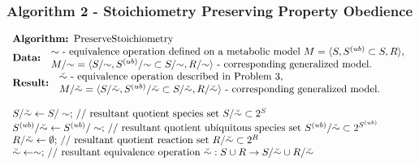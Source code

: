 \documentclass[9pt]{article}
\newcounter{def}
\begin{document}
\subsubsection*{Algorithm 2 - Stoichiometry Preserving Property Obedience}
\[ \begin{array}{l}
\mbox{\textbf{Algorithm: }PreserveStoichiometry}\\
\mbox{\textbf{Data: }} \begin{array}{l} \mbox{${\sim}$ - equivalence operation defined on a metabolic model $M=\langle S, S^{(ub)}\subset{S}, R \rangle$,}\\ \mbox{$M/{\sim} = \langle S/{\sim}, S^{(ub)}/{\sim} \subset S/{\sim}, R/{\sim} \rangle$ - corresponding generalized model.} 
\end{array}\\
\mbox{\textbf{Result: }} \begin{array}{l} \mbox{$\breve{\sim}$ - equivalence operation described in Problem~3,}\\  \mbox{$M/\breve{\sim} = \langle S/\breve{\sim}, S^{(ub)}/\breve{\sim} \subset S/\breve{\sim}, R/\breve{\sim} \rangle$ - corresponding generalized model.} \end{array}\\
\mbox{~}\\
\mbox{$S/\breve{\sim} \leftarrow S/\sim;$ // resultant quotient species set $ S/{\breve{\sim}}\subset 2^S$}\\
\mbox{$S^{(ub)}/\breve{\sim} \leftarrow S^{(ub)}/\sim;$ // resultant quotient ubiquitous species set $ S^{(ub)}/{\breve{\sim}}\subset 2^{S^{(ub)}}$}\\
\mbox{$R/\breve{\sim} \leftarrow \emptyset;$ // resultant quotient reaction set $ R/{\breve{\sim}}\subset 2^R$}\\
\mbox{$\breve{\sim} \leftarrow \sim;$ // resultant equivalence operation $ {\breve{\sim}}: S\cup{R} \rightarrow S/{\breve{\sim}}\cup{R/{\breve{\sim}}}$}\\
\mbox{~}\\


\end{array}\]
\end{document}
